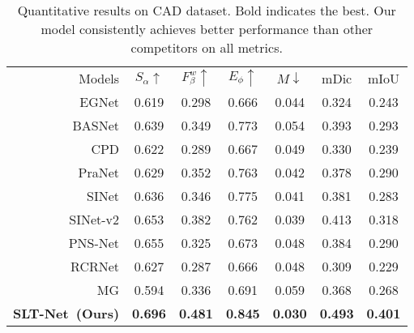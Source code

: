 \documentclass[10pt,twocolumn,letterpaper]{article}
\def\Ourmodel{SLT-Net}
\begin{document}
\begin{table}[t!]
  \footnotesize
  \centering
  \caption{Quantitative results on CAD dataset. Bold indicates the best. 
  Our model consistently achieves better performance than other competitors on all metrics.
  }
  \label{tab:results_CAD}
  \vspace{-5pt}
  \tabcolsep=0.19cm
  \renewcommand{\arraystretch}{0.5}
\begin{tabular}{r|cccccc} 
  \toprule
  Models & $S_\alpha\uparrow$ &$F_\beta^w\uparrow$  &$E_\phi\uparrow$ &$M\downarrow$ & mDic & mIoU\\
  \cmidrule(lr){1-7}
  {EGNet} \cite{zhao2019EGNet}   & 0.619 & 0.298 & 0.666 & 0.044 & 0.324 & 0.243   \\
  {BASNet} \cite{Qin_2019_CVPR}  & 0.639 & 0.349 & 0.773 & 0.054 & 0.393 & 0.293    \\
  {CPD} \cite{Wu_2019_CVPR}      & 0.622 & 0.289 & 0.667 & 0.049 & 0.330 & 0.239 \\
  {PraNet} \cite{fan2020pra}     & 0.629 & 0.352 & 0.763 & 0.042 & 0.378 & 0.290 \\
  {SINet} \cite{fan2020Camouflage}  &  0.636 & 0.346 & 0.775 & 0.041 & 0.381 & 0.283   \\
  {SINet-v2} \cite{fan2021concealed}  &  0.653 & 0.382 & 0.762 & 0.039 & 0.413 & 0.318 \\ 
\cmidrule(lr){1-7}
  {PNS-Net} \cite{ji2021progressively} & 0.655 & 0.325 & 0.673 & 0.048 &  0.384 &  0.290  \\
  {RCRNet} \cite{yan2019semi} & 0.627 & 0.287 & 0.666 & 0.048 & 0.309 & 0.229  \\
  {MG} \cite{yang2021selfsupervised} & 0.594 & 0.336 & 0.691 & 0.059 & 0.368 & 0.268 \\
  
\textbf{\Ourmodel~(Ours)} & \textbf{0.696} & \textbf{0.481} & \textbf{0.845} & \textbf{0.030} & \textbf{0.493} & \textbf{0.401} \\
  \bottomrule
  \end{tabular}
\end{table}
\end{document}
